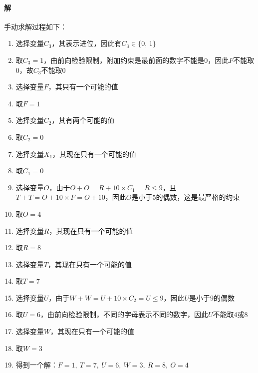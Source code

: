 \documentclass{article}
\begin{document}
\paragraph{解}
手动求解过程如下：
\begin{enumerate}[i]
    \item 选择变量$C_3$，其表示进位，因此有$C_3 \in \{0,\, 1\}$
    \item 取$C_3 = 1$，由前向检验限制，附加约束是最前面的数字不能是0，因此$F$不能取0，故$C_3$不能取0
    \item 选择变量$F$，其只有一个可能的值
    \item 取$F = 1$
    \item 选择变量$C_2$，其有两个可能的值
    \item 取$C_2 = 0$
    \item 选择变量$X_1$，其现在只有一个可能的值
    \item 取$C_1 = 0$
    \item 选择变量$O$，由于$O + O = R + 10 \times C_1 = R \leqslant 9$，且$T + T = O + 10 \times F = O + 10$，因此$O$是小于5的偶数，这是最严格的约束
    \item 取$O = 4$
    \item 选择变量$R$，其现在只有一个可能的值
    \item 取$R = 8$
    \item 选择变量$T$，其现在只有一个可能的值
    \item 取$T = 7$
    \item 选择变量$U$，由于$W + W = U + 10 \times C_2 = U \leqslant 9$，因此$U$是小于9的偶数
    \item 取$U = 6$，由前向检验限制，不同的字母表示不同的数字，因此$U$不能取$4$或$8$
    \item 选择变量$W$，其现在只有一个可能的值
    \item 取$W = 3$
    \item 得到一个解：$F = 1,\ T = 7,\ U = 6,\ W = 3,\ R = 8,\ O = 4$
\end{enumerate}
\end{document}
